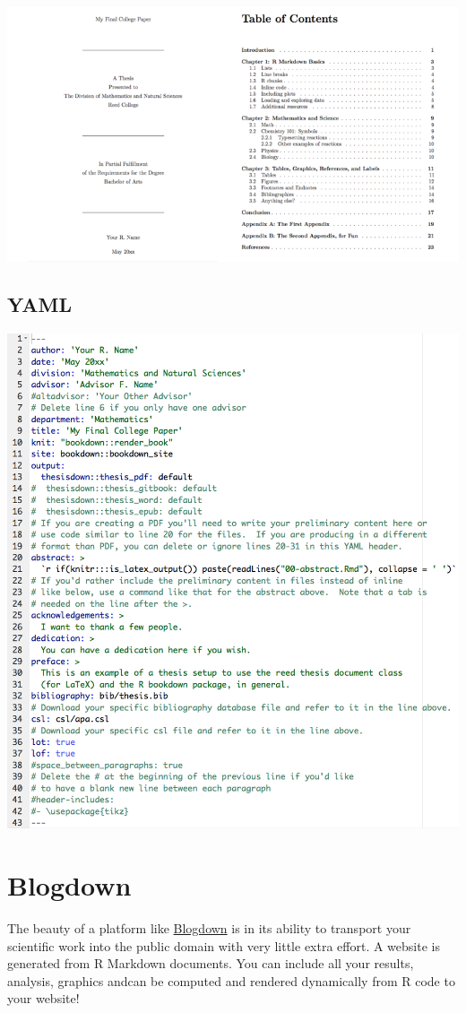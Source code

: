 \documentclass[]{book}
\theoremstyle{definition}
\theoremstyle{definition}
\theoremstyle{remark}
\begin{document}
\includegraphics[width=0.75\linewidth]{images/reed_thesis_demo}

\subsection{YAML}\label{yaml}

\includegraphics[width=0.75\linewidth]{images/reed_yaml}

\section{Blogdown}\label{blogdown}

The beauty of a platform like
\href{https://github.com/rstudio/blogdown}{Blogdown} is in its ability
to transport your scientific work into the public domain with very
little extra effort. A website is generated from R Markdown documents.
You can include all your results, analysis, graphics andcan be computed
and rendered dynamically from R code to your website!
\end{document}
